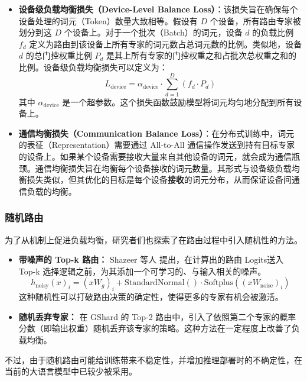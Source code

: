 \begin{itemize}
    \item \textbf{设备级负载均衡损失（Device-Level Balance Loss）}：该损失旨在确保每个设备处理的词元（Token）数量大致相等。假设有 $D$ 个设备，所有路由专家被划分到这 $D$ 个设备上。对于一个批次（Batch）的词元，设备 $d$ 的负载比例 $f_d$ 定义为路由到该设备上所有专家的词元数占总词元数的比例。类似地，设备 $d$ 的总门控权重比例 $P_d$ 是其上所有专家的门控权重之和占批次总权重之和的比例。设备级负载均衡损失可以定义为：
    \begin{equation}
        L_{\text{device}} = \alpha_{\text{device}} \cdot \sum_{d=1}^{D} (f_d \cdot P_d)
    \end{equation}
    其中 $\alpha_{\text{device}}$ 是一个超参数。这个损失函数鼓励模型将词元均匀地分配到所有设备上。

    \item \textbf{通信均衡损失（Communication Balance Loss）}：在分布式训练中，词元的表征（Representation）需要通过 All-to-All 通信操作发送到持有目标专家的设备上。如果某个设备需要接收大量来自其他设备的词元，就会成为通信瓶颈。通信均衡损失旨在均衡每个设备接收的词元数量。其形式与设备级负载均衡损失类似，但其优化的目标是每个设备\textbf{接收}的词元分布，从而保证设备间通信负载的均衡。
\end{itemize}


\subsubsection{随机路由}
为了从机制上促进负载均衡，研究者们也探索了在路由过程中引入随机性的方法。
\begin{itemize}
    \item \textbf{带噪声的 Top-k 路由：} Shazeer 等人\cite{Shazeer2017OutrageouslyLN} 提出，在计算出的路由 Logits送入 Top-k 选择逻辑之前，为其添加一个可学习的、与输入相关的噪声。
    \begin{equation}
        h_{\text{noisy}}(x)_i = (xW_g)_i + \text{StandardNormal}() \cdot \text{Softplus}((xW_{\text{noise}})_i)
    \end{equation}
    这种随机性可以打破路由决策的确定性，使得更多的专家有机会被激活。
    \item \textbf{随机丢弃专家：} 在 GShard\cite{Lepikhin2020GShardSG} 的 Top-2 路由中，引入了依照第二个专家的概率分数（即输出权重）随机丢弃该专家的策略。这种方法在一定程度上改善了负载均衡。
\end{itemize}
不过，由于随机路由可能给训练带来不稳定性，并增加推理部署时的不确定性，在当前的大语言模型中已较少被采用。

